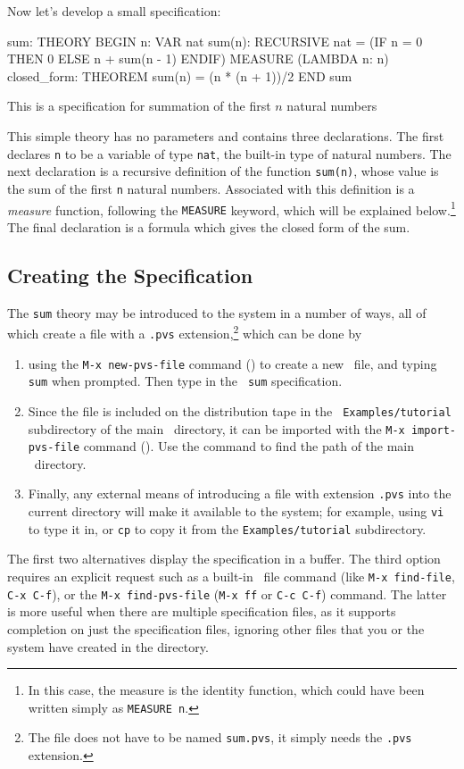 Now let's develop a small specification:
\begin{jmrsession}
sum: THEORY
 BEGIN
  n: VAR nat
  sum(n): RECURSIVE nat =
   (IF n = 0 THEN 0 ELSE n + sum(n - 1) ENDIF)
   MEASURE (LAMBDA n: n)
  closed_form: THEOREM sum(n) = (n * (n + 1))/2
 END sum
\end{jmrsession}
%
This is a specification for summation of the first $n$ natural numbers

This simple theory has no parameters and contains three declarations.
The first declares {\tt n} to be a variable of type {\tt nat}, the
built-in type of natural numbers.  The next declaration is a recursive
definition of the function {\tt sum(n)}, whose value is the sum of the
first {\tt n} natural numbers.  Associated with this definition is a
{\em measure\/} function, following the {\tt MEASURE} keyword, which
will be explained below.\footnote{In this case, the measure is the
identity function, which could have been written simply as {\tt MEASURE
n}.} The final declaration is a formula which gives the closed form of
the sum.

\subsection{Creating the Specification}

The {\tt sum} theory may be introduced to the system in a number of
ways, all of which create a file with a {\tt .pvs}
extension,\footnote{The file does not have to be named {\tt sum.pvs}, it
simply needs the {\tt .pvs} extension.} which can be done by
\begin{enumerate}

\item using the {\tt M-x new-pvs-file} command () to create a new
\pvs\ file, and typing {\tt sum} when prompted.  Then type in the {\tt
sum} specification.

\item Since the file is included on the distribution tape in the {\tt
Examples/tutorial} subdirectory of the main \pvs\ directory, it can be
imported with the {\tt M-x import-pvs-file} command ().  Use
the  command to find the path of the main \pvs\
directory.

\item Finally, any external means of introducing a file with extension
{\tt .pvs} into the current directory will make it available to the
system; for example, using {\tt vi} to type it in, or {\tt cp} to copy
it from the {\tt Examples/tutorial} subdirectory.

\end{enumerate}
The first two alternatives display the specification in a buffer.
The third option requires an explicit request such as a built-in \gnu\
file command (like {\tt M-x find-file}, {\tt C-x C-f}), or the {\tt M-x
find-pvs-file} ({\tt M-x ff} or {\tt C-c C-f}) command.  The latter is
more useful when there are multiple specification files, as it supports
completion on just the specification files, ignoring other files that
you or the system have created in the directory.


